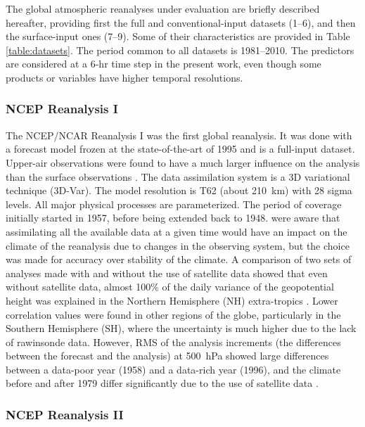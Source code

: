 \documentclass{ametsoc}
\begin{document}
	The global atmospheric reanalyses under evaluation are briefly described hereafter, providing first the full and conventional-input datasets (1--6), and then the surface-input ones (7--9). Some of their characteristics are provided in Table \ref{table:datasets}. The period common to all datasets is 1981--2010. The predictors are considered at a 6-hr time step in the present work, even though some products or variables have higher temporal resolutions.
	
	
	\subsubsection{NCEP Reanalysis I}
	
	The NCEP/NCAR Reanalysis I \citep[NR-1 --][]{Kalnay1996, Kistler2001} was the first global reanalysis. It was done with a forecast model frozen at the state-of-the-art of 1995 and is a full-input dataset. Upper-air observations were found to have a much larger influence on the analysis than the surface observations \citep{Kistler2001}. The data assimilation system is a 3D variational technique (3D-Var). The model resolution is T62 (about 210~km) with 28 sigma levels. All major physical processes are parameterized. The period of coverage initially started in 1957, before being extended back to 1948. \citet{Kalnay1996} were aware that assimilating all the available data at a given time would have an impact on the climate of the reanalysis due to changes in the observing system, but the choice was made for accuracy over stability of the climate. A comparison of two sets of analyses made with and without the use of satellite data showed that even without satellite data, almost 100\% of the daily variance of the geopotential height was explained in the Northern Hemisphere (NH) extra-tropics \citep{Kalnay1996}. Lower correlation values were found in other regions of the globe, particularly in the Southern Hemisphere (SH), where the uncertainty is much higher due to the lack of rawinsonde data. However, RMS of the analysis increments (the differences between the forecast and the analysis) at 500~hPa showed large differences between a data-poor year (1958) and a data-rich year (1996), and the climate before and after 1979 differ significantly due to the use of satellite data \citep{Kistler2001}.
	
	
	\subsubsection{NCEP Reanalysis II}
	
\end{document}
